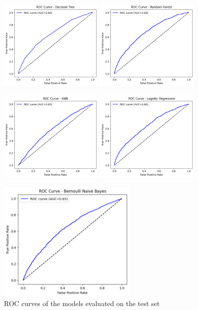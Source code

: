 \begin{figure}[h!]
    \centering

    \includegraphics[width=0.45\textwidth]{images/rocDT.png}
    \includegraphics[width=0.45\textwidth]{images/rocRF.png}

    \includegraphics[width=0.45\textwidth]{images/rocKNN.png}
    \includegraphics[width=0.45\textwidth]{images/rocLR.png}

    \includegraphics[width=0.6\textwidth]{images/rocNB.png}

    \caption{ROC curves of the models evaluated on the test set}
    \label{fig:cinque-immagini}
\end{figure}
